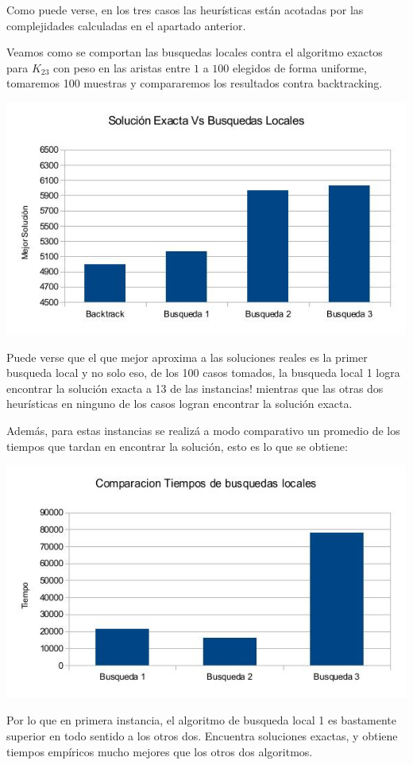 Como puede verse, en los tres casos las heurísticas están acotadas por las complejidades calculadas en el apartado anterior.

Veamos como se comportan las busquedas locales contra el algoritmo exactos para $K_23$ con peso en las aristas entre $1$ a $100$ elegidos de forma uniforme, tomaremos 100 muestras y compararemos los resultados contra backtracking.

\includegraphics[scale=0.5]{Ej4/solucionestodos.jpg}

Puede verse que el que mejor aproxima a las soluciones reales es la primer busqueda local y no solo eso, de los 100 casos tomados, la busqueda local 1 logra encontrar la solución exacta a 13 de las instancias! mientras que las otras dos heurísticas en ninguno de los casos logran encontrar la solución exacta.

Además, para estas instancias se realizá a modo comparativo un promedio de los tiempos que tardan en encontrar la solución, esto es lo que se obtiene:

\includegraphics[scale=0.5]{Ej4/tiempotodos.jpg}

Por lo que en primera instancia, el algoritmo de busqueda local 1 es bastamente superior en todo sentido a los otros dos. Encuentra soluciones exactas, y obtiene tiempos empíricos mucho mejores que los otros dos algoritmos.